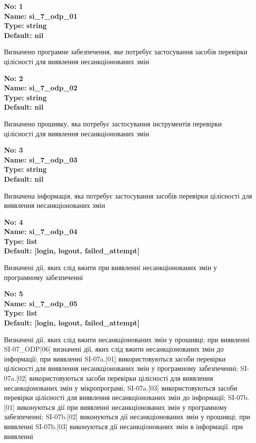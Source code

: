 \documentclass{article}
\begin{document}
\vspace{10pt}
{\footnotesize\bfseries
No: 1\\
Name: si\_7\_odp\_01\\
Type: string\\
Default: nil
}

{\footnotesize Визначено програмне забезпечення, яке потребує застосування засобів перевірки цілісності для виявлення несанкціонованих змін}


{\footnotesize\bfseries
No: 2\\
Name: si\_7\_odp\_02\\
Type: string\\
Default: nil
}

{\footnotesize Визначено прошивку, яка потребує застосування інструментів перевірки цілісності для виявлення несанкціонованих змін}


{\footnotesize\bfseries
No: 3\\
Name: si\_7\_odp\_03\\
Type: string\\
Default: nil
}

{\footnotesize Визначена інформація, яка потребує застосування засобів перевірки цілісності для виявлення несанкціонованих змін}


{\footnotesize\bfseries
No: 4\\
Name: si\_7\_odp\_04\\
Type: list\\
Default: [\textquotedbl{}login\textquotedbl{}, \textquotedbl{}logout\textquotedbl{}, \textquotedbl{}failed\_attempt\textquotedbl{}]
}

{\footnotesize Визначені дії, яких слід вжити при виявленні несанкціонованих змін у програмному забезпеченні}


{\footnotesize\bfseries
No: 5\\
Name: si\_7\_odp\_05\\
Type: list\\
Default: [\textquotedbl{}login\textquotedbl{}, \textquotedbl{}logout\textquotedbl{}, \textquotedbl{}failed\_attempt\textquotedbl{}]
}

{\footnotesize Визначені дії, яких слід вжити несанкціонованих змін у прошивці; при виявленні SI-07\_ODP[06] визначені дії, яких слід вжити несанкціонованих змін до інформації; при виявленні SI-07a.[01] використовуються засоби перевірки цілісності для виявлення несанкціонованих змін у програмному забезпеченні; SI-07a.[02] використовуються засоби перевірки цілісності для виявлення несанкціонованих змін у мікропрограмі; SI-07a.[03] використовуються засоби перевірки цілісності для виявлення несанкціонованих змін до інформації; SI-07b.[01] виконуються дії при виявленні несанкціонованих змін у програмному забезпеченні; SI-07b.[02] виконуються дії несанкціонованих змін у прошивці; при виявленні SI-07b.[03] виконуються дії несанкціонованих змін в інформації. при виявленні}
\end{document}
